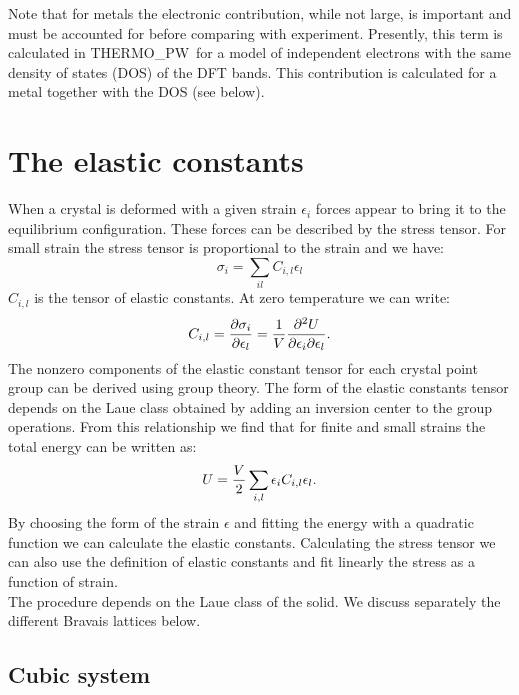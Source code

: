\documentclass[12pt,a4paper]{article}
\def\tpw{{\sc THERMO\_PW}}
\begin{document}
Note that for metals the electronic contribution, while not large, is important 
and must be accounted for before comparing with experiment. Presently,
this term is calculated in \tpw\ for a model of independent electrons with
the same density of states (DOS) of the DFT bands. This contribution is 
calculated for a metal together with the DOS (see below).

\newpage
\section{\color{coral}The elastic constants}

When a crystal is deformed with a given strain $\epsilon_i$ forces
appear to bring it to the equilibrium configuration. These
forces can be described by the stress tensor. For small strain the 
stress tensor is proportional to the strain and we have:
\begin{equation}
\sigma_{i} =\sum_{il} C_{i,l} \epsilon_l 
\end{equation}
$C_{i,l}$ is the tensor of elastic constants. 
At zero temperature we can write:
\begin{equation}
C_{i,l}= {\partial \sigma_i \over \partial \epsilon_{l}}=
{1 \over V}{\partial^2 U \over \partial \epsilon_i \partial \epsilon_l}
.
\end{equation}
The nonzero components of the elastic constant tensor for each crystal point
group can be derived using group theory. The form of the elastic constants
tensor depends on the Laue class obtained by adding an inversion center to
the group operations. From this relationship we find that for finite
and small strains the total energy can be written as:
\begin{equation}
U= {V \over 2} \sum_{i,l} \epsilon_i C_{i,l} \epsilon_l.
\end{equation}
By choosing the form of the strain $\epsilon$ and fitting the
energy with a quadratic function we can calculate the elastic constants.
Calculating the stress tensor we can also use the definition
of elastic constants and fit linearly the stress as a function of strain. \\
The procedure depends on the Laue class of the solid. We discuss separately
the different Bravais lattices below.

\subsection{\color{web-blue}Cubic system}
\end{document}
